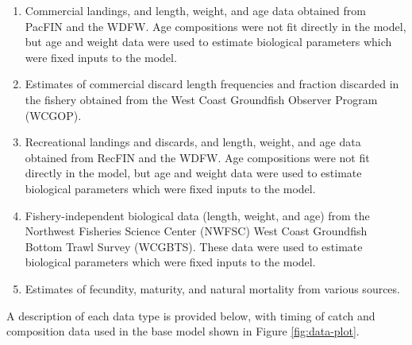 \documentclass[11pt,
  english,
  a4paper,
]{article}
\begin{document}
\begin{enumerate}
\def\labelenumi{\arabic{enumi}.}
\item

  Commercial landings, and length, weight, and age data obtained from PacFIN and the WDFW. Age compositions were not fit directly in the model, but age and weight data were used to estimate biological parameters which were fixed inputs to the model.

  \tagmcend\tagstructend\tagstructend
\item

  Estimates of commercial discard length frequencies and fraction discarded in the fishery obtained from the West Coast Groundfish Observer Program (WCGOP).

  \tagmcend\tagstructend\tagstructend
\item

  Recreational landings and discards, and length, weight, and age data obtained from RecFIN and the WDFW. Age compositions were not fit directly in the model, but age and weight data were used to estimate biological parameters which were fixed inputs to the model.

  \tagmcend\tagstructend\tagstructend
\item

  Fishery-independent biological data (length, weight, and age) from the Northwest Fisheries Science Center (NWFSC) West Coast Groundfish Bottom Trawl Survey (WCGBTS). These data were used to estimate biological parameters which were fixed inputs to the model.

  \tagmcend\tagstructend\tagstructend
\item

  Estimates of fecundity, maturity, and natural mortality from various sources.

  \tagmcend\tagstructend\tagstructend
\end{enumerate}

\tagstructend


A description of each data type is provided below, with timing of catch and composition data used in the base model shown in Figure \ref{fig:data-plot}.
\end{document}
